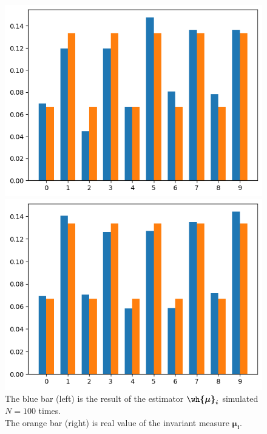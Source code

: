 \begin{figure}[H]
    \centering
    \begin{minipage}[b]{0.49\textwidth}
        \centering
        \includegraphics[width=\textwidth]{../pictures/2.e.1.png}
        \caption*{$N = 100,\; T = 100$}
    \end{minipage}
    \hfill
    \begin{minipage}[b]{0.49\textwidth}
        \centering
        \includegraphics[width=\textwidth]{../pictures/2.e.2.png}
        \caption*{$N = 100,\; T = 1000$}
    \end{minipage}
    \caption*{The {\color{blue} blue bar (left)} is the result of the estimator {\color{blue}$\boldsymbol{\wh{\mu}_i}$} simulated $N=100$ times.\\ The {\color{red} orange bar (right)} is real value of the invariant measure {\color{red}$\boldsymbol{\mu_i}$}. }
\end{figure}

